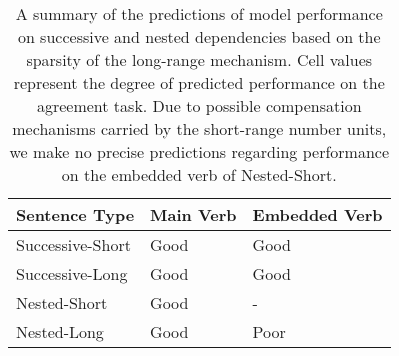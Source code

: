 \begin{center}
\begin{table}
\centering
\begin{tabular}{|P{3.5cm}||P{3.5cm}|P{3.5cm}|}
    \hline
    \B Sentence Type & \B Main Verb & \B Embedded Verb \\
    \hline
    Successive-Short & Good  & Good \\
    \hline
    Successive-Long & Good & Good \\
    \hline
    Nested-Short & Good & - \\
    \hline
    Nested-Long & Good & Poor \\
    \hline
\end{tabular}
\caption{A summary of the predictions of model performance on successive and nested dependencies based on the sparsity of the long-range mechanism. Cell values represent the degree of predicted performance on the agreement task. Due to possible compensation mechanisms carried by the short-range number units, we make no precise predictions regarding performance on the embedded verb of Nested-Short.}
\label{tbl:predictions}
\end{table}
\end{center}